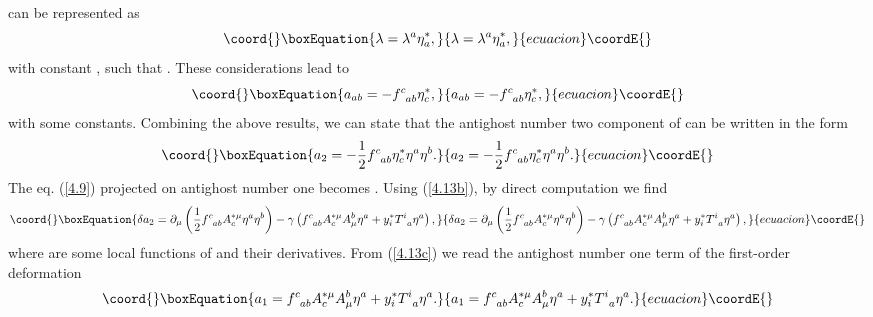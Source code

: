 \documentclass[a4paper,12pt]{article}
\begin{document}
\coordHE{}
can be represented as
\begin{equation}\coord{}\boxEquation{
\lambda =\lambda ^{a}\eta _{a}^{*},  \label{4.13}
}{
\lambda =\lambda ^{a}\eta _{a}^{*},  }{ecuacion}\coordE{}\end{equation}
with constant \coordHE{}, such that
\coordHE{}.
These considerations lead to
\begin{equation}\coord{}\boxEquation{
a_{ab}=-f_{\;\;ab}^{c}\eta _{c}^{*},  \label{4.13a}
}{
a_{ab}=-f_{\;\;ab}^{c}\eta _{c}^{*},  }{ecuacion}\coordE{}\end{equation}
with \coordHE{} some constants.
Combining the above
results, we can state that the antighost
number two component of \coordHE{} can be
written in the form
\begin{equation}\coord{}\boxEquation{
a_{2}=-\frac{1}{2}f_{\;\;ab}^{c}
\eta _{c}^{*}\eta ^{a}\eta ^{b}.
\label{4.13b}
}{
a_{2}=-\frac{1}{2}f_{\;\;ab}^{c}
\eta _{c}^{*}\eta ^{a}\eta ^{b}.
}{ecuacion}\coordE{}\end{equation}
The eq. (\ref{4.9}) projected on antighost
number one becomes \coordHE{}.
Using (\ref{4.13b}), by direct
computation we find
\begin{equation}\coord{}\boxEquation{
\delta a_{2}=\partial _{\mu }\left(
\frac{1}{2}f_{\;\;ab}^{c}A_{c}^{*\mu
}\eta ^{a}\eta ^{b}\right) -\gamma
\left( f_{\;\;ab}^{c}A_{c}^{*\mu }A_{\mu
}^{b}\eta ^{a}+y_{i}^{*}T_{\;\;a}^{i}
\eta ^{a}\right) ,  \label{4.13c}
}{
\delta a_{2}=\partial _{\mu }\left(
\frac{1}{2}f_{\;\;ab}^{c}A_{c}^{*\mu
}\eta ^{a}\eta ^{b}\right) -\gamma
\left( f_{\;\;ab}^{c}A_{c}^{*\mu }A_{\mu
}^{b}\eta ^{a}+y_{i}^{*}T_{\;\;a}^{i}
\eta ^{a}\right) ,  }{ecuacion}\coordE{}\end{equation}
where \coordHE{} are some local
functions of \coordHE{} and their
derivatives. From (\ref{4.13c}) we read
the antighost number one term of the
first-order deformation
\begin{equation}\coord{}\boxEquation{
a_{1}=f_{\;\;ab}^{c}A_{c}^{*\mu }A_{\mu }^{b}\eta
^{a}+y_{i}^{*}T_{\;\;a}^{i}\eta ^{a}.  \label{4.13d}
}{
a_{1}=f_{\;\;ab}^{c}A_{c}^{*\mu }A_{\mu }^{b}\eta
^{a}+y_{i}^{*}T_{\;\;a}^{i}\eta ^{a}.  }{ecuacion}\coordE{}\end{equation}
\end{document}
